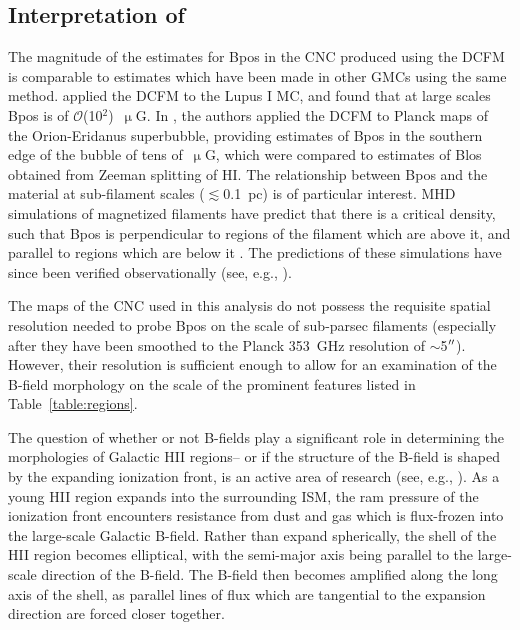 \subsection{Interpretation of }\label{interpreting Bpos}

The magnitude of the estimates for \gls{Bpos} in the CNC produced using the DCFM is comparable to estimates which have been made in other GMCs using the same method. \citet{franco2015tracing} applied the DCFM to the Lupus I MC, and found that at large scales \gls{Bpos} is of $\mathcal{O}$(10$^{2}$)~$\upmu$G. In \citet{soler2018magnetic}, the authors applied the DCFM to Planck maps of the Orion-Eridanus superbubble, providing estimates of \gls{Bpos} in the southern edge of the bubble of tens of~$\upmu$G, which were compared to estimates of \gls{Blos} obtained from Zeeman splitting of HI\@. The relationship between \gls{Bpos} and the material at sub-filament scales ($\lesssim$0.1~pc) is of particular interest. MHD simulations of magnetized filaments have predict that there is a critical density, such that \gls{Bpos} is perpendicular to regions of the filament which are above it, and parallel to regions which are below it \citep{soler2013imprint}. The predictions of these simulations have since been verified observationally (see, e.g., \citet{ade2016planck,soler2017relation,fissel2018relative}).

The maps of the CNC used in this analysis do not possess the requisite spatial resolution needed to probe \gls{Bpos} on the scale of sub-parsec filaments (especially after they have been smoothed to the Planck 353~GHz resolution of $\sim$5$\operatorname{^{\prime\prime}}$). However, their resolution is sufficient enough to allow for an examination of the B-field morphology on the scale of the prominent features listed in Table~\ref{table:regions}.

The question of whether or not B-fields play a significant role in determining the morphologies of Galactic HII regions-- or if the structure of the B-field is shaped by the expanding ionization front, is an active area of research (see, e.g., \citet{churchwell2006bubbling,gendelev2012evolution,anderson2012dust,pavel2012h,tremblin2014age,pellegrini2007magnetically}). As a young HII region expands into the surrounding ISM, the ram pressure of the ionization front encounters resistance from dust and gas which is flux-frozen into the large-scale Galactic B-field. Rather than expand spherically, the shell of the HII region becomes elliptical, with the semi-major axis being parallel to the large-scale direction of the B-field. The B-field then becomes amplified along the long axis of the shell, as parallel lines of flux which are tangential to the expansion direction are forced closer together.

